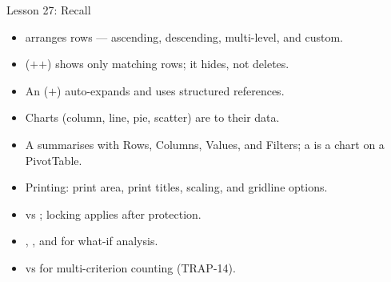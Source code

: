 \documentclass[aspectratio=169]{beamer}
\begin{document}
\begin{frame}{Lesson 27: Recall}
  \begin{itemize}
    \item {} arranges rows --- ascending, descending, multi-level, and
      custom.
    \item {} ($+$$+$) shows only matching
      rows; it hides, not deletes.
    \item An  ($+$) auto-expands and uses
      structured references.
    \item Charts (column, line, pie, scatter) are  to their data.
    \item A  summarises with Rows, Columns, Values, and Filters;
      a  is a chart on a PivotTable.
    \item Printing: print area, print titles, scaling, and gridline options.
    \item {} vs ; locking applies after
      protection.
    \item {}, , and  for
      what-if analysis.
    \item {} vs  for multi-criterion counting
      (TRAP-14).
  \end{itemize}
\end{frame}
\end{document}
